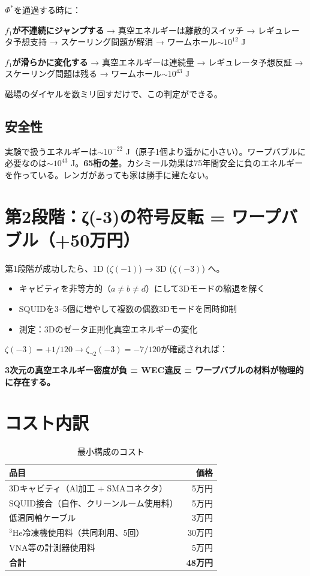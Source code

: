 \documentclass[12pt,a4paper]{article}
\begin{document}
\begin{deepbox}[判定基準]
$\Phi^*$を通過する時に：

\textbf{$f_1$が不連続にジャンプする} → 真空エネルギーは離散的スイッチ → レギュレータ予想支持 → スケーリング問題が解消 → ワームホール$\sim 10^{12}$ J

\textbf{$f_1$が滑らかに変化する} → 真空エネルギーは連続量 → レギュレータ予想反証 → スケーリング問題は残る → ワームホール$\sim 10^{43}$ J

磁場のダイヤルを数ミリ回すだけで、この判定ができる。
\end{deepbox}

\subsection{安全性}

実験で扱うエネルギーは$\sim 10^{-22}$ J（原子1個より遥かに小さい）。ワープバブルに必要なのは$\sim 10^{43}$ J。\textbf{65桁の差}。カシミール効果は75年間安全に負のエネルギーを作っている。レンガがあっても家は勝手に建たない。

\section{第2段階：ζ(-3)の符号反転 = ワープバブル（+50万円）}

第1段階が成功したら、1D ($\zeta(-1)$) → 3D ($\zeta(-3)$) へ。

\begin{itemize}
\item キャビティを非等方的（$a \neq b \neq d$）にして3Dモードの縮退を解く
\item SQUIDを3--5個に増やして複数の偶数3Dモードを同時抑制
\item 測定：3Dのゼータ正則化真空エネルギーの変化
\end{itemize}

$\zeta(-3) = +1/120 \to \zeta_{\neg 2}(-3) = -7/120$が確認されれば：

\textbf{3次元の真空エネルギー密度が負 = WEC違反 = ワープバブルの材料が物理的に存在する。}

\section{コスト内訳}

\begin{table}[h]
\centering
\caption{最小構成のコスト}
\begin{tabular}{lr}
\toprule
品目 & 価格 \\
\midrule
3Dキャビティ（Al加工 + SMAコネクタ） & 5万円 \\
SQUID接合（自作、クリーンルーム使用料） & 5万円 \\
低温同軸ケーブル & 3万円 \\
$^3$He冷凍機使用料（共同利用、5回） & 30万円 \\
VNA等の計測器使用料 & 5万円 \\
\midrule
\textbf{合計} & \textbf{48万円} \\
\bottomrule
\end{tabular}
\end{table}
\end{document}
